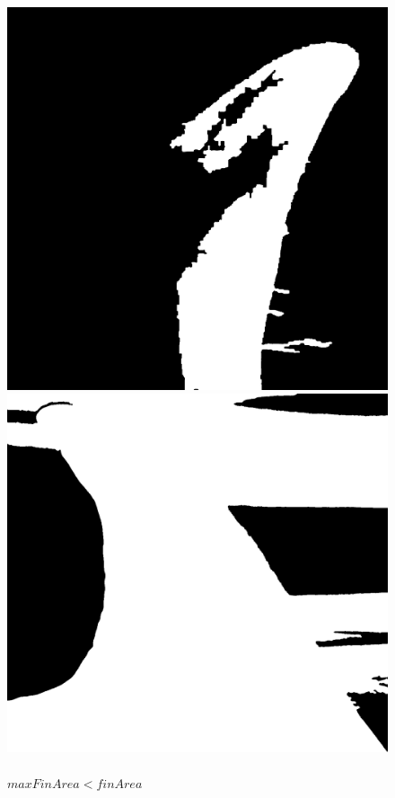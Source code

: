 \documentclass[a4paper,12pt]{report}
\begin{document}
    \begin{figure}[H]
      \centering
      \begin{minipage}{0.4\textwidth}
        \centering
        \includegraphics[width=\textwidth]{assets/images/methods/porting/quality_control/less.png}  
        \caption{\\$finArea < minFinArea$}
      \end{minipage}
      \begin{minipage}{0.4\textwidth}
        \centering
        \includegraphics[width=\textwidth]{assets/images/methods/porting/quality_control/too.png}   
        \caption{\\$maxFinArea < finArea$}
      \end{minipage}
    \end{figure}
    
\end{document}
